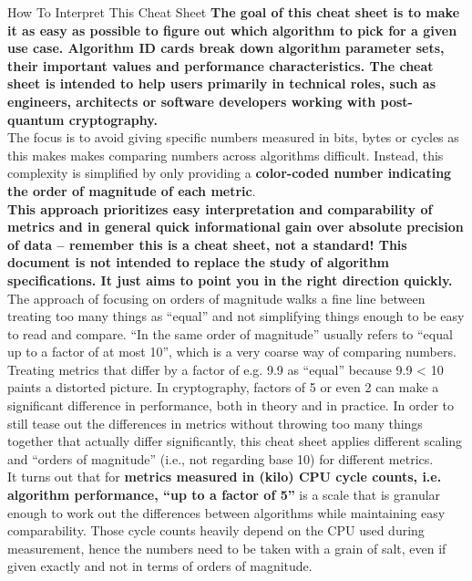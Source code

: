 \documentclass[11pt,english,a4paper, landscape]{scrartcl}
\begin{document}
	\hfill
	\begin{minipage}[t]{0.58\textwidth} %
		\vspace{-3mm}
		\begin{algorithmbox}{How To Interpret This Cheat Sheet}
			\scriptsize
			{\bfseries The goal of this cheat sheet is to make it as easy as possible to figure out which algorithm to pick for a given use case. Algorithm ID cards break down algorithm parameter sets, their important values and performance characteristics. The cheat sheet is intended to help users primarily in technical roles, such as engineers, architects or software developers working with post-quantum cryptography.}\\[\baselineskip]

			The focus is to avoid giving specific numbers measured in bits, bytes or cycles as this makes makes comparing numbers across algorithms difficult. Instead, this complexity is simplified by only providing a
			{\bfseries color-coded number indicating the order of magnitude of each metric}.\\[\baselineskip]

			{\bfseries This approach prioritizes easy interpretation and comparability of metrics and in general quick informational gain over absolute precision of data -- remember this is a cheat sheet, not a standard! This document is not intended to replace the study of algorithm specifications. It just aims to point you in the right direction quickly.}\\[\baselineskip]

			The approach of focusing on orders of magnitude walks a fine line between treating too many things as ``equal'' and not simplifying things enough to be easy to read and compare. ``In the same order of magnitude'' usually refers to ``equal up to a factor of at most 10'', which is a very coarse way of comparing numbers. Treating metrics that differ by a factor of e.g. 9.9 as ``equal'' because 9.9 < 10 paints a distorted picture. In cryptography, factors of 5 or even 2 can make a significant difference in performance, both in theory and in practice. In order to still tease out the differences in metrics without throwing too many things together that actually differ significantly, this cheat sheet applies different scaling and ``orders of magnitude'' (i.e., not regarding base 10) for different metrics.\\[\baselineskip]


			It turns out that for {\bfseries metrics measured in (kilo) CPU cycle counts, i.e. algorithm performance, ``up to a factor of 5''} is a scale that is granular enough to work out the differences between algorithms while maintaining easy comparability. Those cycle counts heavily depend on the CPU used during measurement, hence the numbers need to be taken with a grain of salt, even if given exactly and not in terms of orders of magnitude.\\[\baselineskip]


\end{algorithmbox}
\end{minipage}
\end{document}
